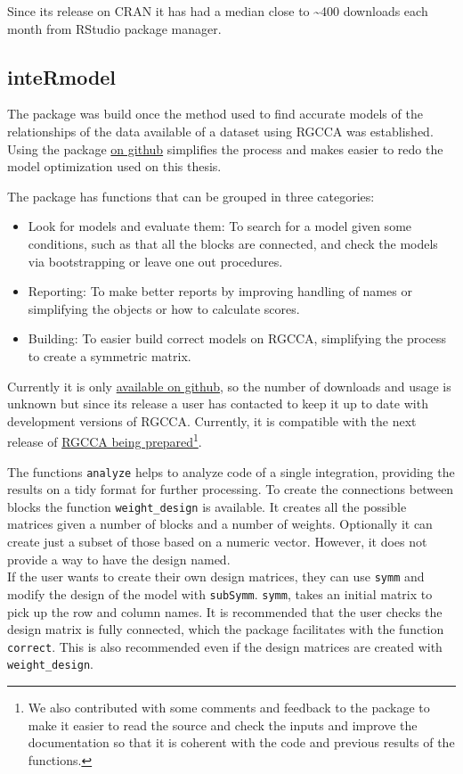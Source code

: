 \documentclass[
  12pt,
  a4paper,
  twoside,
  openright]{book}
\begin{document}
Since its release on CRAN it has had a median close to \textasciitilde400 downloads each month from RStudio package manager.

\hypertarget{intermodel}{%
\subsection{inteRmodel}\label{intermodel}}

The package was build once the method used to find accurate models of the relationships of the data available of a dataset using RGCCA was established.
Using the package \href{https://github.com/llrs/intermodel}{on github} simplifies the process and makes easier to redo the model optimization used on this thesis.

The package has functions that can be grouped in three categories:

\begin{itemize}
\item
  Look for models and evaluate them:
  To search for a model given some conditions, such as that all the blocks are connected, and check the models via bootstrapping or leave one out procedures.
\item
  Reporting: To make better reports by improving handling of names or simplifying the objects or how to calculate scores.
\item
  Building: To easier build correct models on RGCCA, simplifying the process to create a symmetric matrix.
\end{itemize}

Currently it is only \href{https:intermodel.llrs.dev}{available on github}, so the number of downloads and usage is unknown but since its release a user has contacted to keep it up to date with development versions of RGCCA.
Currently, it is compatible with the next release of \href{https://github.com/rgcca-factory/RGCCA/tree/CRAN}{RGCCA being prepared}\footnote{We also contributed with some comments and feedback to the package to make it easier to read the source and check the inputs and improve the documentation so that it is coherent with the code and previous results of the functions.}.

The functions \texttt{analyze} helps to analyze code of a single integration, providing the results on a tidy format for further processing.
To create the connections between blocks the function \texttt{weight\_design} is available.
It creates all the possible matrices given a number of blocks and a number of weights.
Optionally it can create just a subset of those based on a numeric vector.
However, it does not provide a way to have the design named.\\
If the user wants to create their own design matrices, they can use \texttt{symm} and modify the design of the model with \texttt{subSymm}.
\texttt{symm}, takes an initial matrix to pick up the row and column names.
It is recommended that the user checks the design matrix is fully connected, which the package facilitates with the function \texttt{correct}.
This is also recommended even if the design matrices are created with \texttt{weight\_design}.
\end{document}
